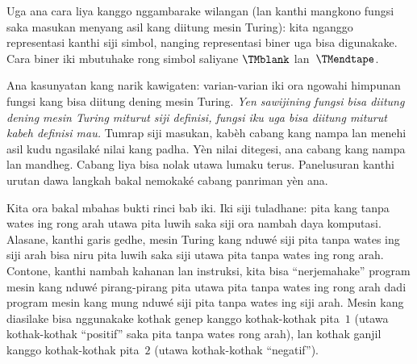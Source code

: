 \documentclass[../../../include/open-logic-section]{subfiles}
\begin{document}
Uga ana cara liya kanggo nggambarake wilangan
(lan kanthi mangkono fungsi saka masukan menyang asil kang diitung
mesin Turing): kita nganggo representasi kanthi siji
simbol, nanging representasi biner uga bisa digunakake.
Cara biner iki mbutuhake rong simbol saliyane
$\TMblank$ lan~$\TMendtape$.

Ana kasunyatan kang narik kawigaten: varian-varian iki
ora ngowahi himpunan fungsi kang bisa diitung dening
mesin Turing. \emph{Yen sawijining fungsi bisa diitung
dening mesin Turing miturut siji definisi, fungsi iku
uga bisa diitung miturut kabeh definisi mau.} Tumrap siji masukan, kabèh cabang kang nampa lan menehi asil kudu ngasilaké nilai kang padha. Yèn nilai ditegesi, ana cabang kang nampa lan mandheg. Cabang liya bisa nolak utawa lumaku terus. Panelusuran kanthi urutan dawa langkah bakal nemokaké cabang panriman yèn ana.

Kita ora bakal mbahas bukti rinci bab iki. Iki siji
tuladhane: pita kang tanpa wates ing rong arah utawa
pita luwih saka siji ora nambah daya komputasi.
Alasane, kanthi garis gedhe, mesin Turing kang nduwé
siji pita tanpa wates ing siji arah bisa niru pita
luwih saka siji utawa pita tanpa wates ing rong arah.
Contone, kanthi nambah kahanan lan instruksi, kita
bisa ``nerjemahake'' program mesin kang nduwé pirang-pirang
pita utawa pita tanpa wates ing rong arah dadi program
mesin kang mung nduwé siji pita tanpa wates ing siji
arah. Mesin kang diasilake bisa nggunakake kothak
genep kanggo kothak-kothak pita~$1$ (utawa kothak-kothak
``positif'' saka pita tanpa wates rong arah), lan
kothak ganjil kanggo kothak-kothak pita~$2$ (utawa
kothak-kothak ``negatif'').
\end{document}

